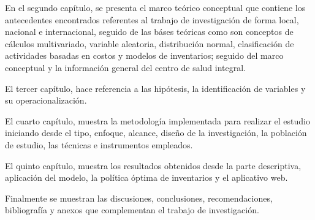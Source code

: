 \begin{introduccion}
En el segundo capítulo, se presenta el marco teórico conceptual que contiene los antecedentes encontrados referentes al trabajo de investigación de forma local, nacional e internacional, seguido de las báses teóricas como son conceptos de cálculos multivariado, variable aleatoria, distribución normal, clasificación de actividades basadas en costos y modelos de inventarios; seguido del marco conceptual y la información general del centro de salud integral.

El tercer capítulo, hace referencia a las hipótesis, la identificación de variables y su operacionalización.

El cuarto capítulo, muestra la metodología implementada para realizar el estudio iniciando desde el tipo, enfoque, alcance, diseño de la investigación, la población de estudio, las técnicas e instrumentos empleados.

El quinto capítulo, muestra los resultados obtenidos desde la parte descriptiva, aplicación del modelo, la política óptima de inventarios y el aplicativo web.

Finalmente se muestran las discusiones, conclusiones, recomendaciones, bibliografía y anexos que complementan el trabajo de investigación.

\end{introduccion}
